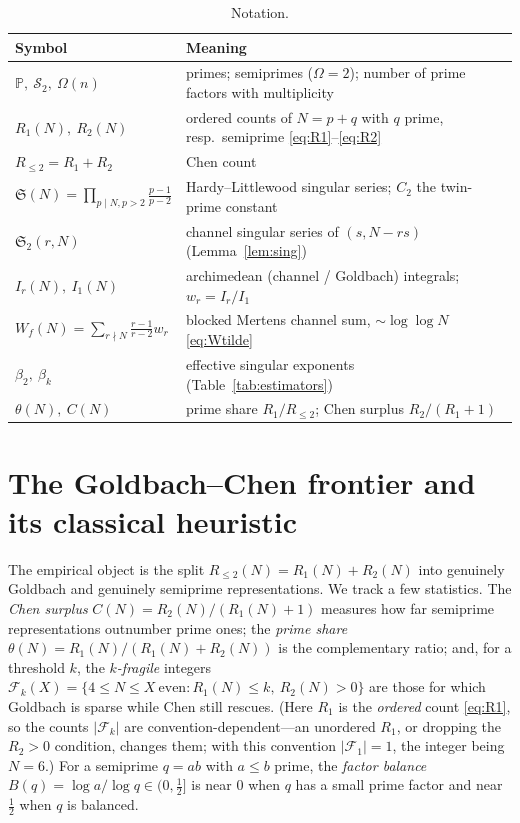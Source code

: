\documentclass[]{interact}%
\newcommand{\PP}{\mathbb P}
\newcommand{\SSemi}{\mathcal S_2}
\newcommand{\OmegaF}{\Omega}
\newcommand{\sing}{\mathfrak S}
\begin{document}
\begin{table}[h]
\centering
\small
\begin{tabular}{@{}l >{\raggedright\arraybackslash}p{8.6cm}@{}}
\toprule
Symbol & Meaning\\
\midrule
$\PP,\ \SSemi,\ \OmegaF(n)$ & primes; semiprimes ($\OmegaF=2$); number of prime factors with multiplicity\\
$R_1(N),\ R_2(N)$ & ordered counts of $N=p+q$ with $q$ prime, resp.\ semiprime \eqref{eq:R1}--\eqref{eq:R2}\\
$R_{\le2}=R_1+R_2$ & Chen count\\
$\sing(N)=\prod_{p\mid N,p>2}\frac{p-1}{p-2}$ & Hardy--Littlewood singular series; $C_2$ the twin-prime constant\\
$\sing_2(r,N)$ & channel singular series of $(s,N-rs)$ (Lemma~\ref{lem:sing})\\
$I_r(N),\ I_1(N)$ & archimedean (channel / Goldbach) integrals; $w_r=I_r/I_1$\\
$W_f(N)=\sum_{r\nmid N}\frac{r-1}{r-2}w_r$ & blocked Mertens channel sum, $\sim\log\log N$ \eqref{eq:Wtilde}\\
$\beta_2,\ \beta_k$ & effective singular exponents (Table~\ref{tab:estimators})\\
$\theta(N),\ C(N)$ & prime share $R_1/R_{\le2}$; Chen surplus $R_2/(R_1+1)$\\
\bottomrule
\end{tabular}
\caption{Notation.}
\label{tab:notation}
\end{table}

\section{The Goldbach--Chen frontier and its classical heuristic}
\label{sec:frontier}

The empirical object is the split $R_{\le2}(N)=R_1(N)+R_2(N)$ into genuinely Goldbach and
genuinely semiprime representations. We track a few statistics. The \emph{Chen surplus}
$C(N)=R_2(N)/(R_1(N)+1)$ measures how far semiprime representations outnumber prime ones; the
\emph{prime share} $\theta(N)=R_1(N)/(R_1(N)+R_2(N))$ is the complementary ratio; and, for a
threshold $k$, the \emph{$k$-fragile} integers
$\mathcal F_k(X)=\{4\le N\le X\ \mathrm{even}:R_1(N)\le k,\ R_2(N)>0\}$ are those for which Goldbach
is sparse while Chen still rescues. (Here $R_1$ is the \emph{ordered} count \eqref{eq:R1}, so the
counts $|\mathcal F_k|$ are convention-dependent---an unordered $R_1$, or dropping the $R_2>0$
condition, changes them; with this convention $|\mathcal F_1|=1$, the integer being $N=6$.) For a semiprime $q=ab$ with $a\le b$ prime, the \emph{factor
balance} $B(q)=\log a/\log q\in(0,\tfrac12]$ is near $0$ when $q$ has a small prime factor and
near $\tfrac12$ when $q$ is balanced.
\end{document}
